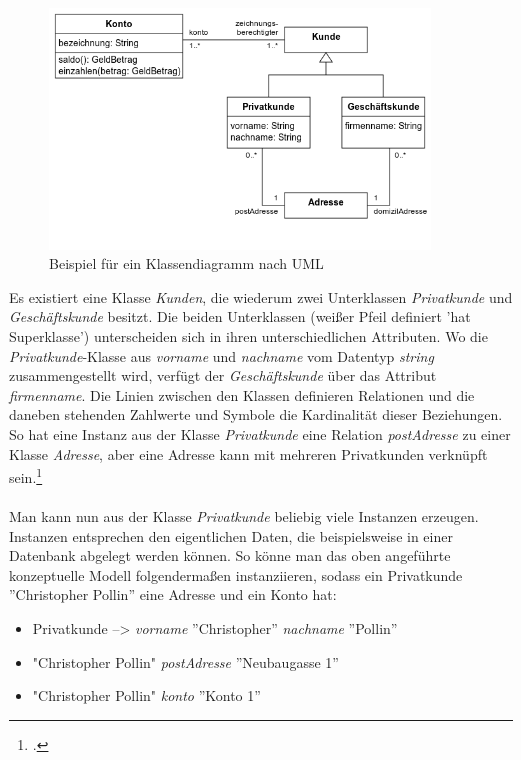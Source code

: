 \documentclass[12pt,a4paper]{article}
\begin{document}
\begin{figure}[H]
\centering
	\includegraphics[width=0.9\textwidth]{img/uml.png}  
    \caption[Beispiel für ein Klassendiagramm nach UML, \protect\url{de.wikipedia.org/wiki/Unified_Modeling_Language}, 10.06.2019]{Beispiel für ein Klassendiagramm nach UML}\label{fig:uml}
\end{figure} 
Es existiert eine Klasse \textit{Kunden}, die wiederum zwei Unterklassen \textit{Privatkunde} und \textit{Geschäftskunde} besitzt. Die beiden Unterklassen (weißer Pfeil definiert 'hat Superklasse') unterscheiden sich in ihren unterschiedlichen Attributen. Wo die \textit{Privatkunde}-Klasse aus \textit{vorname} und \textit{nachname} vom Datentyp \textit{string} zusammengestellt wird, verfügt der \textit{Geschäftskunde} über das Attribut \textit{firmenname}. Die Linien zwischen den Klassen definieren Relationen und die daneben stehenden Zahlwerte und Symbole die Kardinalität dieser Beziehungen. So hat eine Instanz aus der Klasse \textit{Privatkunde} eine Relation \textit{postAdresse} zu einer Klasse \textit{Adresse}, aber eine Adresse kann mit mehreren Privatkunden verknüpft sein.\footcite[][S.99-108]{jannidis2017digital} 
\\
\\
Man kann nun aus der Klasse \textit{Privatkunde} beliebig viele Instanzen erzeugen. Instanzen entsprechen den eigentlichen Daten, die beispielsweise in einer Datenbank abgelegt werden können. So könne man das oben angeführte konzeptuelle Modell folgendermaßen instanziieren, sodass ein Privatkunde ''Christopher Pollin'' eine Adresse und ein Konto hat: 
\begin{itemize}
    \item[] Privatkunde --> \textit{vorname} ''Christopher'' \textit{nachname} ''Pollin''
    \item[] "Christopher Pollin" \textit{postAdresse} ''Neubaugasse 1''
    \item[] "Christopher Pollin" \textit{konto} ''Konto 1''
\end{itemize}{}
\end{document}
